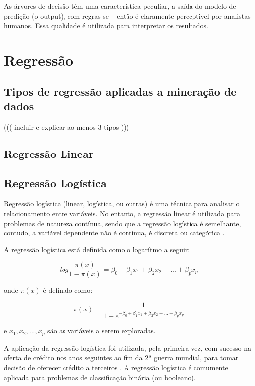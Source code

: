 As árvores de decisão têm uma característica peculiar, a saída do modelo de predição (o output), com regras se -- então é claramente perceptivel por analistas humanos.
Essa qualidade é utilizada para interpretar os resultados.


\section{Regressão}

\subsection{Tipos de regressão aplicadas a mineração de dados}

((( incluir e explicar ao menos 3 tipos )))

\subsection{Regressão Linear}

\subsection{Regressão Logística}
Regressão logística (linear, logística, ou outras) é uma técnica para analisar o relacionamento entre variáveis. No entanto, a regressão linear é utilizada para problemas de natureza
contínua, sendo que a regressão logística é semelhante, contudo, a variável dependente não é contínua, é discreta ou categórica \cite{DecisaoCredito}.

A regressão logística está definida como o logarítmo a seguir:

\begin{equation}
 log{\frac{\pi(x)}{1-\pi(x)}} = \beta_0 + \beta_1 x_1 + \beta_2 x_2 + ... + \beta_p x_p
\end{equation}

onde $\pi(x)$ é definido como:

\begin{equation}
 \pi(x) = \dfrac{1}{1 + e^{-{\beta_0 + \beta_1 x_1 + \beta_2 x_2 + ... + \beta_p x_p}}}
\end{equation}

e $x_1, x_2,..., x_p$ são as variáveis a serem exploradas.


A aplicação da regressão logística foi utilizada, pela primeira vez, com sucesso na oferta de crédito nos anos seguintes ao fim da 2ª guerra mundial, para tomar decisão 
de oferecer crédito a terceiros \cite{RegrecaoLog}.
A regressão logística é comumente aplicada para problemas de classificação binária (ou booleano).

